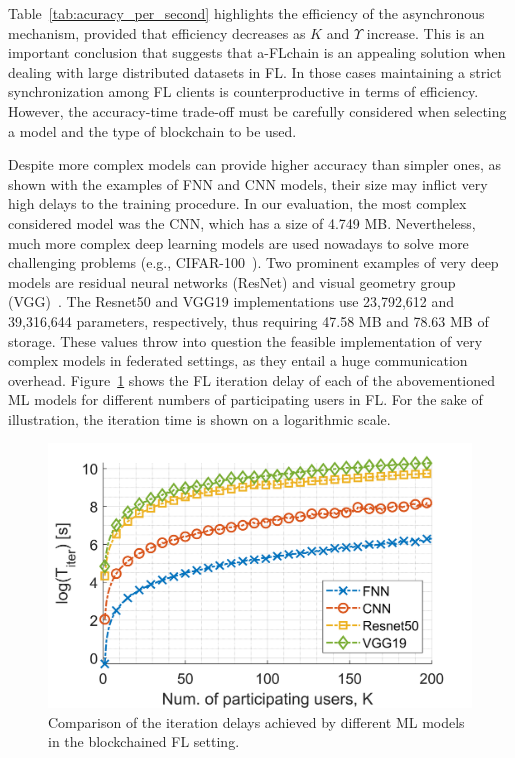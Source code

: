 \documentclass[lettersize,journal]{IEEEtran}
\begin{document}
Table~\ref{tab:acuracy_per_second} highlights the efficiency of the asynchronous mechanism, provided that efficiency decreases as $K$ and $\Upsilon$ increase. This is an important conclusion that suggests that a-FLchain is an appealing solution when dealing with large distributed datasets in FL. In those cases 
maintaining a strict synchronization among FL clients is counterproductive in terms of efficiency. However, the accuracy-time trade-off must be carefully considered when selecting a model and the type of blockchain to be used.

Despite more complex models can provide higher accuracy than simpler ones, as shown with the examples of FNN and CNN models, their size may inflict very high delays to the training procedure. In our evaluation, the most complex considered model was the CNN, which has a size of 4.749 MB. Nevertheless, much more complex deep learning models are used nowadays to solve more challenging problems (e.g., CIFAR-100~\cite{krizhevsky2009learning}). Two prominent examples of very deep models are residual neural networks (ResNet) and visual geometry group (VGG)~\cite{simonyan2014very}. The Resnet50 and VGG19 implementations use 23,792,612 and 39,316,644 parameters, respectively, thus requiring 47.58 MB and 78.63 MB of storage. These values throw into question the feasible implementation of very complex models in federated settings, as they entail a huge communication overhead. Figure~\ref{fig:plot_delay_per_iteration_models} shows the FL iteration delay of each of the abovementioned ML models for different numbers of participating users in FL. For the sake of illustration, the iteration time is shown on a logarithmic scale.

\begin{figure}[ht!]
	\centering
	\includegraphics[width=0.8\linewidth]{img/plot_delay_per_iteration_models.png}
	\caption{Comparison of the iteration delays achieved by different ML models in the blockchained FL setting.}	\label{fig:plot_delay_per_iteration_models}
\end{figure}
\end{document}
